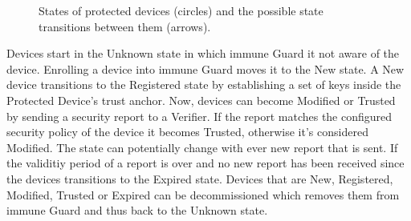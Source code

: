 \documentclass[a4paper,oneside,10pt,extrafontsizes]{memoir}
\begin{document}
\begin{figure}[ht!]
  \centerfloat
  \caption{States of protected devices (circles) and the possible state transitions between them (arrows).}
  \label{fig:states}  
\end{figure}

Devices start in the Unknown state in which immune Guard it not aware of the
device. Enrolling a device into immune Guard moves it to the New state. A New
device transitions to the Registered state by establishing a set of keys inside
the Protected Device's trust anchor. Now, devices can become Modified or
Trusted by sending a security report to a Verifier. If the report matches the
configured security policy of the device it becomes Trusted, otherwise it's
considered Modified. The state can potentially change with ever new report that
is sent. If the validitiy period of a report is over and no new report has been
received since the devices transitions to the Expired state. Devices that are
New, Registered, Modified, Trusted or Expired can be decommissioned which
removes them from immune Guard and thus back to the Unknown state.
\end{document}
